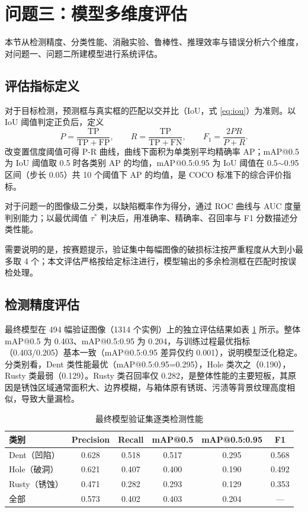 \section{问题三：模型多维度评估}

本节从检测精度、分类性能、消融实验、鲁棒性、推理效率与错误分析六个维度，对问题一、问题二所建模型进行系统评估。

\subsection{评估指标定义}

对于目标检测，预测框与真实框的匹配以交并比（IoU，式 \eqref{eq:iou}）为准则。以 IoU 阈值判定正负后，定义
\begin{equation}
  P = \frac{\mathrm{TP}}{\mathrm{TP}+\mathrm{FP}}, \qquad
  R = \frac{\mathrm{TP}}{\mathrm{TP}+\mathrm{FN}}, \qquad
  F_1 = \frac{2PR}{P+R}.
  \label{eq:prf1}
\end{equation}
改变置信度阈值可得 P-R 曲线，曲线下面积为单类别平均精确率 AP；mAP@0.5 为 IoU 阈值取 0.5 时各类别 AP 的均值，mAP@0.5:0.95 为 IoU 阈值在 0.5$\sim$0.95 区间（步长 0.05）共 10 个阈值下 AP 的均值，是 COCO 标准下的综合评价指标\cite{everingham2010,lin2014coco}。

对于问题一的图像级二分类，以缺陷概率作为得分，通过 ROC 曲线与 AUC 度量判别能力；以最优阈值 $\tau^{*}$ 判决后，用准确率、精确率、召回率与 F1 分数描述分类性能。

需要说明的是，按赛题提示，验证集中每幅图像的破损标注按严重程度从大到小最多取 4 个；本文评估严格按给定标注进行，模型输出的多余检测框在匹配时按误检处理。

\subsection{检测精度评估}

最终模型在 494 幅验证图像（1314 个实例）上的独立评估结果如表 \ref{tab:per_class} 所示。整体 mAP@0.5 为 0.403、mAP@0.5:0.95 为 0.204，与训练过程最优指标（0.403/0.205）基本一致（mAP@0.5:0.95 差异仅约 0.001），说明模型泛化稳定。分类别看，Dent 类性能最优（mAP@0.5:0.95=0.295），Hole 类次之（0.190），Rusty 类最弱（0.129）。Rusty 类召回率仅 0.282，是整体性能的主要短板，其原因是锈蚀区域通常面积大、边界模糊，与箱体原有锈斑、污渍等背景纹理高度相似，导致大量漏检。

\begin{table}[H]
\centering
{}
\caption{最终模型验证集逐类检测性能}\label{tab:per_class}
\begin{tabular}{lccccc}
  \toprule
  类别 & Precision & Recall & mAP@0.5 & mAP@0.5:0.95 & F1 \\
  \midrule
  Dent（凹陷） & 0.628 & 0.518 & 0.517 & 0.295 & 0.568 \\
  Hole（破洞） & 0.621 & 0.407 & 0.400 & 0.190 & 0.492 \\
  Rusty（锈蚀） & 0.471 & 0.282 & 0.293 & 0.129 & 0.353 \\
  \midrule
  全部 & 0.573 & 0.402 & 0.403 & 0.204 & — \\
  \bottomrule
\end{tabular}
\end{table}

